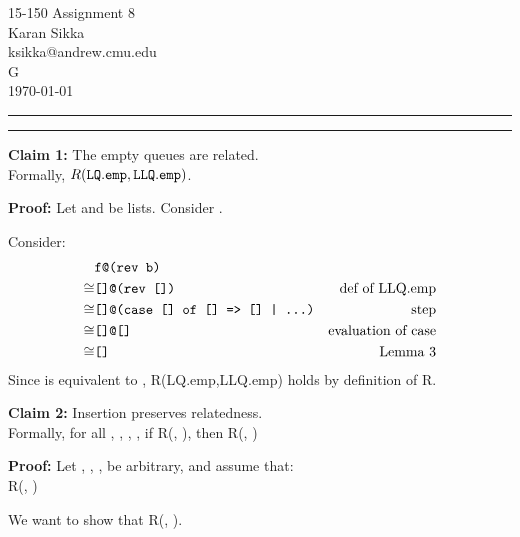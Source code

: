 \documentclass[11pt,letterpaper]{article}
\makeatletter
\newcommand{\question}[2] {\vspace{.25in} \hrule\vspace{0.5em}
\noindent{\bf #1: #2} \vspace{0.5em}
\hrule \vspace{.10in}}
\newcommand{\myname}{Karan Sikka}
\newcommand{\myandrew}{ksikka@andrew.cmu.edu}
\newcommand{\myhwnum}{8}
\makeatother
\begin{document}
\medskip

\thispagestyle{plain}
\begin{center}                  %
{\Large 15-150 Assignment \myhwnum} \\
\myname \\
\myandrew \\
G \\
\today \\
\end{center}


\question{1}{Task 3.1}
\textbf{Claim 1:} The empty queues are related.\\
Formally, $R(\mathtt{LQ.emp},\mathtt{LLQ.emp})$.

\textbf{Proof:} Let  and  be lists. Consider .

Consider:
\begin{align*}
      & \texttt{f@(rev b)}                      & \\
\cong & \texttt{[]@(rev [])}                    &\text{def of LLQ.emp} \\
\cong & \texttt{[]@(case [] of [] => [] | ...)} &\text{step} \\
\cong & \texttt{[]@[]}                          &\text{evaluation of case} \\
\cong & \texttt{[]}                             &\text{Lemma 3}
\end{align*}
Since  is equivalent to , 
R(LQ.emp,LLQ.emp) holds by definition of R.

\textbf{Claim 2:} Insertion preserves relatedness.\\
Formally, for all , , , ,
if R(, ), then R(, )

\textbf{Proof:}
Let , , ,  be arbitrary,
and assume that:\\
R(, )

We want to show that R(, ).
\end{document}
